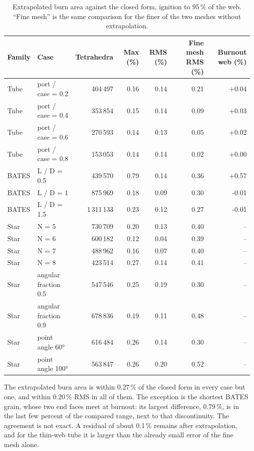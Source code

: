 \documentclass[10pt,a4paper]{article}
\begin{document}
\begin{table}[H]
\centering\small
\caption{Extrapolated burn area against the closed form, ignition to 95\,\% of the web. ``Fine
mesh'' is the same comparison for the finer of the two meshes without extrapolation.}
\label{tab:closed}
\begin{tabular}{llrrrrr}
\toprule
Family & Case & Tetrahedra & Max (\%) & RMS (\%) & Fine mesh RMS (\%) & Burnout web (\%) \\
\midrule
Tube & port / case = 0.2 & 404\,497 & 0.16 & 0.14 & 0.21 & +0.04 \\
Tube & port / case = 0.4 & 353\,854 & 0.15 & 0.14 & 0.09 & +0.03 \\
Tube & port / case = 0.6 & 270\,593 & 0.14 & 0.13 & 0.05 & +0.02 \\
Tube & port / case = 0.8 & 153\,053 & 0.14 & 0.14 & 0.02 & +0.00 \\
BATES & L / D = 0.5 & 439\,570 & 0.79 & 0.14 & 0.36 & +0.57 \\
BATES & L / D = 1 & 875\,969 & 0.18 & 0.09 & 0.30 & -0.01 \\
BATES & L / D = 1.5 & 1\,311\,133 & 0.23 & 0.12 & 0.27 & -0.01 \\
Star & N = 5 & 730\,709 & 0.20 & 0.13 & 0.40 & -- \\
Star & N = 6 & 600\,182 & 0.12 & 0.04 & 0.39 & -- \\
Star & N = 7 & 488\,962 & 0.16 & 0.07 & 0.40 & -- \\
Star & N = 8 & 423\,514 & 0.27 & 0.14 & 0.41 & -- \\
Star & angular fraction 0.5 & 547\,546 & 0.25 & 0.19 & 0.30 & -- \\
Star & angular fraction 0.9 & 678\,836 & 0.19 & 0.11 & 0.48 & -- \\
Star & point angle 60\si{\degree} & 616\,484 & 0.26 & 0.14 & 0.30 & -- \\
Star & point angle 100\si{\degree} & 563\,847 & 0.26 & 0.20 & 0.52 & -- \\
\bottomrule
\end{tabular}
\end{table}

The extrapolated burn area is within 0.27\,\% of the closed form in every case but one, and
within 0.20\,\% RMS in all of them. The exception is the shortest BATES grain, whose two
end faces meet at burnout: its largest difference, 0.79\,\%, is in the last few percent of
the compared range, next to that discontinuity. The agreement is not exact. A residual of about
0.1\,\% remains after extrapolation, and for the thin-web tube it is larger than the already small
error of the fine mesh alone.
\end{document}
